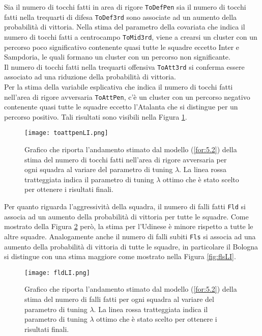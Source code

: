 Sia il numero di tocchi fatti in area di rigore \texttt{ToDefPen} sia il numero di tocchi fatti nella trequarti di difesa \texttt{ToDef3rd} sono associate ad un aumento della probabilità di vittoria. Nella stima del parametro della covariata che indica il numero di tocchi fatti a centrocampo \texttt{ToMid3rd}, viene a crearsi un cluster con un percorso poco significativo contenente quasi tutte le squadre eccetto Inter e Sampdoria, le quali formano un cluster con un percorso non significante.\\
Il numero di tocchi fatti nella trequarti offensiva \texttt{ToAtt3rd} si conferma essere associato ad una riduzione della probabilità di vittoria.\\
Per la stima della variabile esplicativa che indica il numero di tocchi fatti nell'area di rigore avversaria \texttt{ToAttPen}, c'è un cluster con un percorso negativo contenente quasi tutte le squadre eccetto l'Atalanta che si distingue per un percorso positivo. Tali risultati sono visibili nella Figura \ref{fig:toattpenLI}.\\
\begin{figure}[htbp]
	\begin{center}
		\texttt{[image: toattpenLI.png]}
		\caption{Grafico che riporta l'andamento stimato dal modello (\ref{for:5.2}) della stima del numero di tocchi fatti nell'area di rigore avversaria per ogni squadra al variare del parametro di tuning $\lambda$. La linea rossa tratteggiata indica il parametro di tuning $\lambda$ ottimo che è stato scelto per ottenere i risultati finali.} \label{fig:toattpenLI}
	\end{center}
\end{figure}
Per quanto riguarda l'aggressività della squadra, il numero di falli fatti \texttt{Fld} si associa ad un aumento della probabilità di vittoria per tutte le squadre. Come mostrato della Figura \ref{fig:fldLI} però, la stima per l'Udinese è minore rispetto a tutte le altre squadre. Analogamente anche il numero di falli subiti \texttt{Fls} si associa ad una aumento della probabilità di vittoria di tutte le squadre, in particolare il Bologna si distingue con una stima maggiore come mostrato nella Figura \ref{fig:flsLI}.
\begin{figure}[]
	\begin{center}
		\texttt{[image: fldLI.png]}
		\caption{Grafico che riporta l'andamento stimato dal modello (\ref{for:5.2}) della stima del numero di falli fatti per ogni squadra al variare del parametro di tuning $\lambda$. La linea rossa tratteggiata indica il parametro di tuning $\lambda$ ottimo che è stato scelto per ottenere i risultati finali.} \label{fig:fldLI}
	\end{center}
\end{figure}
